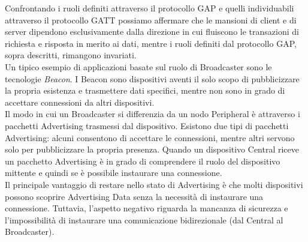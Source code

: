 \noindent Confrontando i ruoli definiti attraverso il protocollo GAP e quelli individuabili attraverso il protocollo GATT possiamo affermare che le mansioni di client e di server dipendono esclusivamente dalla direzione in cui fluiscono le transazioni di richiesta e risposta in merito ai dati, mentre i ruoli definiti dal protocollo GAP, sopra descritti, rimangono invariati.\\

\noindent Un tipico esempio di applicazioni basate sul ruolo di Broadcaster sono le tecnologie \textit{Beacon}. I Beacon sono dispositivi aventi il solo scopo di pubblicizzare la propria esistenza e trasmettere dati specifici, mentre non sono in grado di accettare connessioni da altri dispositivi.\\

\noindent Il modo in cui un Broadcaster si differenzia da un nodo Peripheral è attraverso i pacchetti Advertising trasmessi dal dispositivo. Esistono due tipi di pacchetti Advertising: alcuni consentono di accettare le connessioni, mentre altri servono solo per pubblicizzare la propria presenza. Quando un dispositivo Central riceve un pacchetto Advertising è in grado di comprendere il ruolo del dispositivo mittente e quindi se è possibile instaurare una connessione.\\
Il principale vantaggio di restare nello stato di Advertising è che molti dispositivi possono scoprire Advertising Data senza la necessità di instaurare una connessione. Tuttavia, l'aspetto negativo riguarda la mancanza di sicurezza e l'impossibilità di instaurare una comunicazione bidirezionale (dal Central al Broadcaster).

